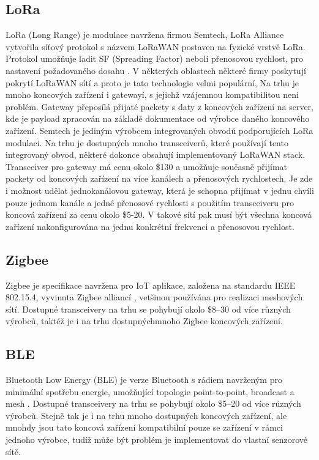 \subsection{LoRa}
LoRa (Long Range) je modulace navržena firmou Semtech, LoRa Alliance vytvořila síťový protokol s názvem LoRaWAN postaven na fyzické vrstvě LoRa.
Protokol umožňuje ladit SF (Spreading Factor) neboli přenosovou rychlost, pro nastavení požadovaného dosahu \cite{lorawan_specification}.
V některých oblastech některé firmy poskytují pokrytí LoRaWAN sítí a proto je tato technologie velmi populární, Na trhu je mnoho koncových zařízení i gatewayí, s jejichž vzájemnou kompatibilitou neni problém. Gateway přeposílá přijaté packety s daty z koncových zařízení na server, kde je payload zpracován na základě dokumentace od výrobce daného koncového zařízení.
Semtech je jediným výrobcem integrovaných obvodů podporujících LoRa modulaci. Na trhu je dostupných mnoho transceiverů, které používají tento integrovaný obvod, některé dokonce obsahují implementovaný LoRaWAN stack.
Transceiver pro gateway má cenu okolo \$130 a umožňuje současně přijímat packety od koncových zařízení na více kanálech a přenosových rychlostech. Je zde i možnost udělat jednokanálovou gateway, která je schopna přijímat v jednu chvíli pouze jednom kanále a jedné přenosové rychlosti s použitím transceiveru pro koncová zařízení za cenu okolo \$5-20. V takové sítí pak musí být všechna koncová zařízení nakonfigurována na jednu konkrétní frekvenci a přenosovou rychlost.





\subsection{Zigbee}
Zigbee je specifikace navržena pro IoT aplikace, založena na standardu  IEEE 802.15.4, vyvinuta Zigbee alliancí \cite{Zigbee_alliance}, vetšinou používána pro realizaci meshových sítí.
Dostupné transceivery na trhu se pohybují okolo \$8–30 od více různých výrobců, taktéž je i na trhu dostupnýchmnoho Zigbee koncových zařízení.


\subsection{BLE}
Bluetooth Low Energy (BLE) je verze Bluetooth s rádiem navrženým pro minimální spotřebu energie, umožňující topologie point-to-point, broadcast a mesh \cite{BT_alliance}.
Dostupné transceivery na trhu se pohybují okolo \$5–20 od více různých výrobců. Stejně tak je i na trhu mnoho dostupných koncových zařízení, ale mnohdy jsou tato koncová zařízení kompatibilní pouze se zařízení v rámci jednoho výrobce, tudíž může být problém je implementovat do vlastní senzorové sítě. 




